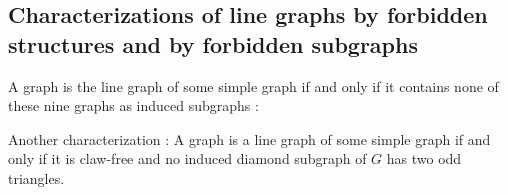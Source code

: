 \documentclass[11pt]{article}
\begin{document}
\subsection{Characterizations of line graphs by forbidden structures and by forbidden subgraphs}

A graph is the line graph of some simple graph if and only if it contains none of these nine graphs as induced subgraphs \cite{vanRooij}:

\begin{figure}[H]
\centering
	\begin{minipage}{.3\textwidth}
		\centering
		
	\end{minipage}
	\begin{minipage}{.3\textwidth}
		\centering
		
	\end{minipage}
	\begin{minipage}{.3\textwidth}
		\centering
		
	\end{minipage}
\end{figure}
\begin{figure}[H]
\centering
	\begin{minipage}{.3\textwidth}
		\centering
		
	\end{minipage}
	\begin{minipage}{.3\textwidth}
		\centering
		
	\end{minipage}
	\begin{minipage}{.3\textwidth}
		\centering
		
	\end{minipage}
\end{figure}
\begin{figure}[H]
\centering
	\begin{minipage}{.3\textwidth}
		\centering
		
	\end{minipage}
	\begin{minipage}{.3\textwidth}
		\centering
		
	\end{minipage}
	\begin{minipage}{.3\textwidth}
		\centering
		
	\end{minipage}
\end{figure}

Another characterization \cite{vanRooij}: A graph is a line graph of some simple graph if and only if it is claw-free and no induced diamond subgraph of $G$ has two odd triangles.
\end{document}
